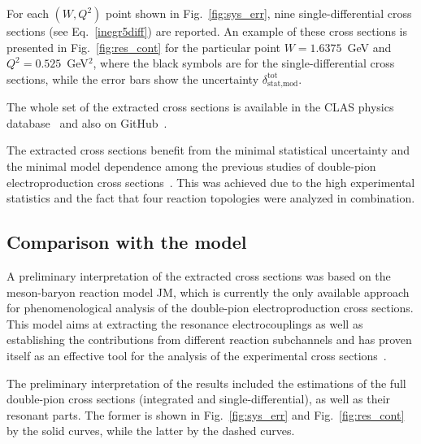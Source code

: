 \documentclass[prc,twocolumn,superscriptaddress,showpacs,amssymb,amsmath,amsfonts,aps,nofootinbib]{revtex4-1}
\begin{document}
For each $(W,Q^{2})$ point shown in Fig.~\ref{fig:sys_err},
nine single-differential cross sections (see Eq.~\eqref{inegr5diff}) are  reported. An example of these cross sections is presented in Fig.~\ref{fig:res_cont} for the particular point  $W = 1.6375$~GeV and $Q^{2} = 0.525$~GeV$^{2}$, where the black symbols are for the single-differential cross sections, while the error  bars show the uncertainty $\delta^{\text{tot}}_{\text{stat,mod}}$. 

The whole set of the extracted cross sections is available in the CLAS physics database~\cite{CLAS_DB} and also on GitHub~\cite{Github:data}.


The extracted cross sections benefit from the minimal statistical uncertainty and the minimal model dependence among the previous studies of double-pion electroproduction cross sections~\cite{Fedotov:2008aa,Isupov:2017lnd,Ripani:2002ss}. This was achieved due to the high experimental statistics and the fact that four reaction topologies were analyzed in combination. 



\subsection{Comparison with the model }




A preliminary interpretation of the extracted cross sections was based on the meson-baryon reaction model JM, which is currently the only available approach for phenomenological analysis of the double-pion electroproduction cross sections. This model aims at extracting the resonance electrocouplings as well as
establishing the contributions from different reaction subchannels and has proven itself as an effective tool for the analysis of the experimental cross sections~\cite{Mokeev:2008iw,Mokeev:2012vsa,Mokeev:2015lda}.

The preliminary interpretation of the results included the estimations of the full double-pion cross sections (integrated and single-differential),  as well as their resonant parts. The former is shown in Fig.~\ref{fig:sys_err} and Fig.~\ref{fig:res_cont} by the solid curves, while the latter by the dashed curves.
\end{document}
